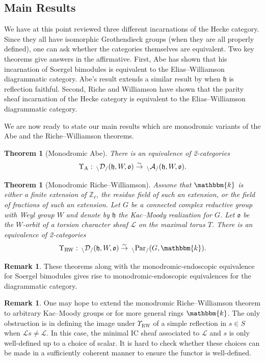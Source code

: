 \documentclass{amsart}
\newcommand{\Z}{\mathbb{Z}}
\renewcommand{\k}{\mathbbm{k}}
\newcommand{\scrL}{\mathcal{L}}
\newcommand{\fr}[1]{\mathfrak{#1}}
\DeclareMathOperator{\RW}{RW}
\newcommand{\PEE}[2]{\:_{#1 \backslash} \textnormal{Par}_{/ #2} }
\newcommand{\EWmon}[2]{\:_{#1 \backslash} \mathcal{D}_{/ #2} }
\newcommand{\Amon}[2]{\:_{#1 \backslash} \mathcal{A}_{/ #2} }
\newtheorem{theorem}[subsubsection]{Theorem}
\theoremstyle{definition}
\newtheorem{remark}[subsubsection]{Remark}
\numberwithin{equation}{subsection}
\begin{document}
\subsection{Main Results}

We have at this point reviewed three different incarnations of the Hecke category.
Since they all have isomorphic Grothendieck groups (when they are all properly defined), one can ask whether the categories themselves are equivalent.
Two key theorems give answers in the affirmative. First, Abe \cite{Abe19} has shown that his incarnation of Soergel bimodules is equivalent to the Elias--Williamson diagrammatic category.
Abe's result extends a similar result by \cite{EW} when $\fr{h}$ is reflection faithful.
Second, Riche and Williamson \cite{RW} have shown that the parity sheaf incarnation of the Hecke category is equivalent to the Elias--Williamson diagrammatic category.

We are now ready to state our main results which are monodromic variants of the Abe and the Riche--Williamson theorems.

\begin{theorem}[Monodromic Abe]\label{thm:intro_Abe}
    There is an equivalence of 2-categories
    \[\Upsilon_{\textnormal{A}} : \EWmon{}{} (\fr{h}, W, \fr{o}) \stackrel{\sim}{\to} \Amon{}{} (\fr{h}, W, \fr{o}).\]
\end{theorem}

\begin{theorem}[Monodromic Riche--Williamson]\label{thm:intro_RW}
    Assume that $\k$ is either a finite extension of $\Z_{\ell}$, the residue field of such an extension, or the field of fractions of such an extension.
    Let $G$ be a connected complex reductive group with Weyl group $W$ and denote by $\fr{h}$ the Kac--Moody realization for $G$.
    Let $\fr{o}$ be the $W$-orbit of a torsion character sheaf $\scrL$ on the maximal torus $T$.
    There is an equivalence of 2-categories
    \[\Upsilon_{\RW} : \EWmon{}{} (\fr{h}, W, \fr{o}) \stackrel{\sim}{\to} \PEE{}{} (G, \k).\]
\end{theorem}

\begin{remark}
    These theorems along with the monodromic-endoscopic equivalence for Soergel bimodules gives rise to monodromic-endoscopic equivalences for the diagrammatic category.
\end{remark}

\begin{remark}
    One may hope to extend the monodromic Riche--Williamson theorem to arbitrary Kac--Moody groups or for more general rings $\k$.
    The only obstruction is in defining the image under $\Upsilon_{\RW}$ of a simple reflection in $s \in S$ when $\scrL s \neq \scrL$.
    In this case, the minimal IC sheaf associated to $\scrL$ and $s$ is only well-defined up to a choice of scalar.
    It is hard to check whether these choices can be made in a sufficiently coherent manner to ensure the functor is well-defined.
\end{remark}
\end{document}
